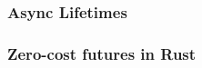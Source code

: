% 
% 
% 
% 
\begin{frame}[fragile]
    \frametitle{Async Lifetimes}
\end{frame}
% 
% 
% 
% 
% 
% 
% 
% 
\begin{frame}[fragile]
    \frametitle{Zero-cost futures in Rust}
\end{frame}
% 
% 
% 
% 
% 

